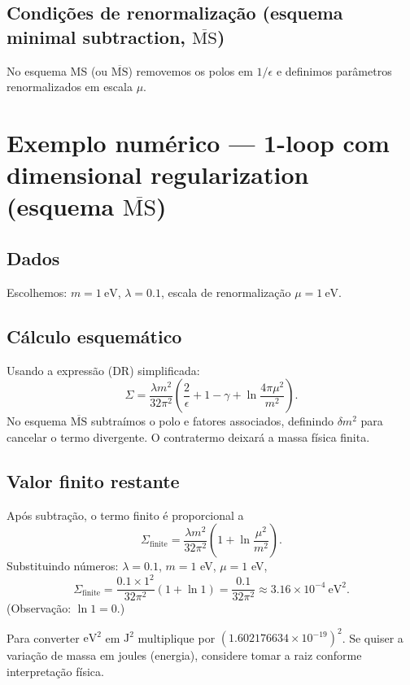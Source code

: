 \documentclass[12pt,a4paper]{article}
\begin{document}
\subsection{Condições de renormalização (esquema minimal subtraction, $\overline{\text{MS}}$)}
No esquema MS (ou \(\overline{\text{MS}}\)) removemos os polos em \(1/\epsilon\) e definimos parâmetros renormalizados em escala \(\mu\).

\section{Exemplo numérico — 1-loop com dimensional regularization (esquema $\overline{\text{MS}}$)}
\subsection{Dados}
Escolhemos: \(m=1\ \mathrm{eV}\), \(\lambda = 0.1\), escala de renormalização \(\mu = 1\ \mathrm{eV}\).

\subsection{Cálculo esquemático}
Usando a expressão (DR) simplificada:
\begin{equation}
\Sigma = \frac{\lambda m^2}{32\pi^2} \left(\frac{2}{\epsilon} + 1 - \gamma + \ln\frac{4\pi\mu^2}{m^2}\right).
\end{equation}
No esquema \(\overline{\text{MS}}\) subtraímos o polo e fatores associados, definindo \(\delta m^2\) para cancelar o termo divergente. O contratermo deixará a massa física finita.

\subsection{Valor finito restante}
Após subtração, o termo finito é proporcional a
\begin{equation}
\Sigma_{\text{finite}} = \frac{\lambda m^2}{32\pi^2} \left(1 + \ln\frac{\mu^2}{m^2}\right).
\end{equation}
Substituindo números: \(\lambda=0.1\), \(m=1\) eV, \(\mu=1\) eV,
\[
\Sigma_{\text{finite}} = \frac{0.1\times 1^2}{32\pi^2} (1 + \ln 1) = \frac{0.1}{32\pi^2} \approx 3.16\times10^{-4}\ \mathrm{eV}^2.
\]
(Observação: \(\ln 1 = 0\).)

Para converter \(\mathrm{eV}^2\) em \(\mathrm{J}^2\) multiplique por \((1.602176634\times10^{-19})^2\). Se quiser a variação de massa em joules (energia), considere tomar a raiz conforme interpretação física.
\end{document}
